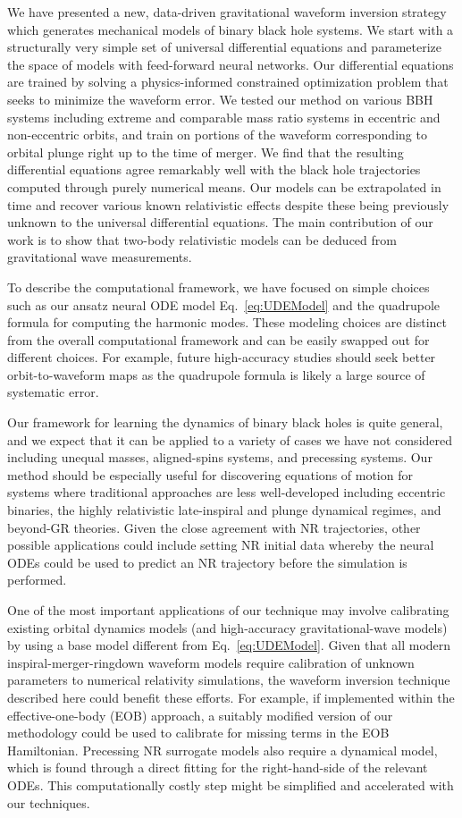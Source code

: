 \documentclass[ reprint,
nofootinbib,
 amsmath,amssymb,
 aps,
]{revtex4-2}
\begin{document}
We have presented a new, data-driven
gravitational waveform inversion strategy which generates
mechanical models of binary black hole systems. We start with a structurally very simple set of universal differential equations
and parameterize the space of models with feed-forward neural networks. Our differential equations are trained 
by solving a physics-informed constrained optimization problem that seeks to minimize the waveform error. We tested our method 
on various BBH systems including extreme and comparable mass ratio systems in eccentric and non-eccentric orbits, 
and train on portions of the waveform corresponding to orbital plunge right up to the time of merger.
We find that the resulting differential equations agree remarkably well 
with the black hole trajectories computed through purely numerical means.
Our models can be extrapolated in time and recover various known relativistic effects despite these being 
previously unknown to the universal differential equations. The main contribution of our work is to show that
two-body relativistic models can be deduced from gravitational wave measurements.

To describe the computational framework, we have focused on simple choices 
such as our ansatz neural ODE model Eq.~\eqref{eq:UDEModel} and the quadrupole formula for computing the harmonic modes.
These modeling choices are distinct from the overall computational framework and can be easily swapped out for different choices. For example, future high-accuracy studies should seek better orbit-to-waveform maps as the 
quadrupole formula is likely a large source of systematic error.

Our framework for learning the dynamics of binary black holes is quite general, and we expect that it can be applied to a variety of cases we have not considered including unequal masses, aligned-spins systems, and precessing systems.
Our method should be especially useful for discovering equations of motion for systems
where traditional approaches are less well-developed including
eccentric binaries, the highly relativistic late-inspiral and plunge dynamical regimes, and beyond-GR 
theories. Given the close agreement with NR trajectories, other possible applications could include setting NR initial data whereby the neural ODEs could be used to predict an NR trajectory before the simulation is performed.

One of the most important applications of our technique may involve calibrating existing orbital dynamics models (and high-accuracy gravitational-wave models) by using a base model different from Eq.~\eqref{eq:UDEModel}. Given that all modern inspiral-merger-ringdown waveform models require calibration of unknown parameters to numerical relativity simulations, the waveform inversion technique described here could benefit these efforts. For example, if implemented within the effective-one-body (EOB) approach, a suitably modified version of our methodology could be used to calibrate for missing terms in the EOB Hamiltonian. Precessing NR surrogate models also require a dynamical model, which is found through a direct fitting for the right-hand-side of the relevant ODEs. This computationally costly step might be simplified and accelerated with our techniques.
\end{document}

